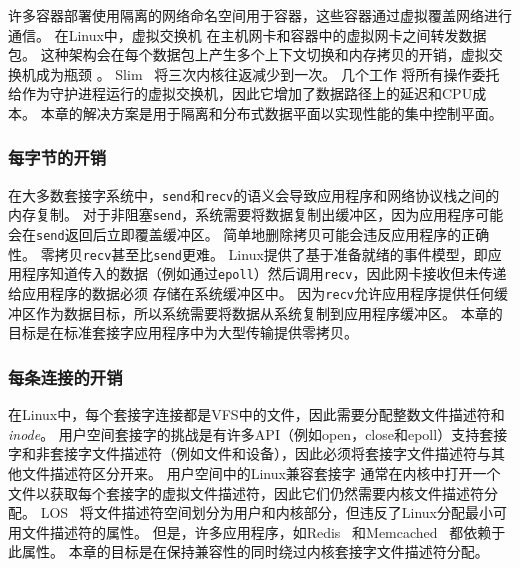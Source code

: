 许多容器部署使用隔离的网络命名空间用于容器，这些容器通过虚拟覆盖网络进行通信。
在Linux中，虚拟交换机 \cite {pfaff2015design}在主机网卡和容器中的虚拟网卡之间转发数据包。
这种架构会在每个数据包上产生多个上下文切换和内存拷贝的开销，虚拟交换机成为瓶颈 \cite {pfefferle2015hybrid}。
Slim~ \cite {slim}将三次内核往返减少到一次。
几个工作 \cite {martins2014clickos,roghanchi2017ffwd,huang2017high,nsdi19freeflow}将所有操作委托给作为守护进程运行的虚拟交换机，因此它增加了数据路径上的延迟和CPU成本。
本章的解决方案是用于隔离和分布式数据平面以实现性能的集中控制平面。


\subsubsection{每字节的开销}
\label{socksdirect:subsec:per-byte-overhead}

在大多数套接字系统中，\texttt {send}和\texttt {recv}的语义会导致应用程序和网络协议栈之间的内存复制。 对于非阻塞\texttt {send}，系统需要将数据复制出缓冲区，因为应用程序可能会在\texttt {send}返回后立即覆盖缓冲区。 简单地删除拷贝可能会违反应用程序的正确性。
零拷贝\texttt {recv}甚至比\texttt {send}更难。
Linux提供了基于准备就绪的事件模型，即应用程序知道传入的数据（例如通过\texttt {epoll}）然后调用\texttt {recv}，因此网卡接收但未传递给应用程序的数据必须 存储在系统缓冲区中。
因为\texttt {recv}允许应用程序提供任何缓冲区作为数据目标，所以系统需要将数据从系统复制到应用程序缓冲区。
本章的目标是在标准套接字应用程序中为大型传输提供零拷贝。



\subsubsection{每条连接的开销}
\label{socksdirect:subsec:per-connection-overhead}

在Linux中，每个套接字连接都是VFS中的文件，因此需要分配整数文件描述符和\emph {inode}。
用户空间套接字的挑战是有许多API（例如open，close和epoll）支持套接字和非套接字文件描述符（例如文件和设备），因此必须将套接字文件描述符与其他文件描述符区分开来。
用户空间中的Linux兼容套接字 \cite {libvma,rsockets}通常在内核中打开一个文件以获取每个套接字的虚拟文件描述符，因此它们仍然需要内核文件描述符分配。
LOS~ \cite {huang2017high}将文件描述符空间划分为用户和内核部分，但违反了Linux分配最小可用文件描述符的属性。
但是，许多应用程序，如Redis~ \cite {redis}和Memcached~ \cite {memcached}都依赖于此属性。
本章的目标是在保持兼容性的同时绕过内核套接字文件描述符分配。


